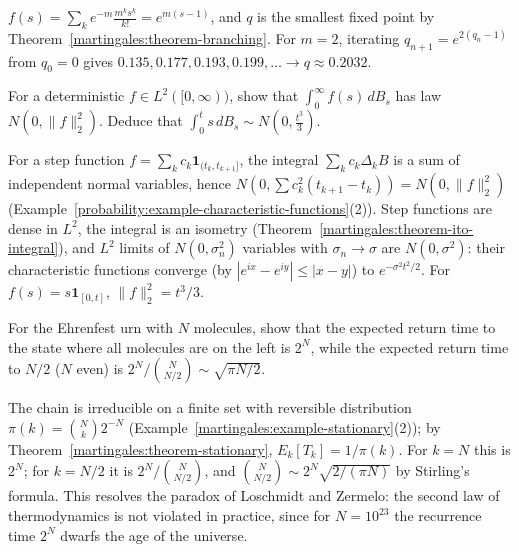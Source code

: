 \begin{solution}
$f(s) = \sum_ke^{-m}\frac{m^ks^k}{k!} = e^{m(s - 1)}$, and $q$ is the smallest fixed point by Theorem~\ref{martingales:theorem-branching}. For $m = 2$, iterating $q_{n+1} = e^{2(q_n - 1)}$ from $q_0 = 0$ gives
$0.135, 0.177, 0.193, 0.199, \ldots \to q \approx 0.2032$.
\end{solution}

\begin{exercise}\label{martingales:exercise-wiener-integral}
For a deterministic $f \in L^2([0, \infty))$, show that $\int_0^\infty f(s)\,dB_s$ has law $N(0, \|f\|_2^2)$. Deduce that $\int_0^ts\,dB_s \sim N(0, \frac{t^3}{3})$.
\end{exercise}

\begin{solution}
For a step function $f = \sum_kc_k\mathbf{1}_{(t_k, t_{k+1}]}$, the integral $\sum_kc_k\Delta_kB$ is a sum of independent normal variables, hence $N(0, \sum c_k^2(t_{k+1} - t_k)) = N(0, \|f\|_2^2)$
(Example~\ref{probability:example-characteristic-functions}(2)). Step functions are dense in $L^2$, the integral is an isometry (Theorem~\ref{martingales:theorem-ito-integral}), and $L^2$ limits of $N(0, \sigma_n^2)$ variables with
$\sigma_n \to \sigma$ are $N(0, \sigma^2)$: their characteristic functions converge (by $|e^{ix} - e^{iy}| \leq |x - y|$) to $e^{-\sigma^2t^2/2}$. For $f(s) = s\mathbf{1}_{[0, t]}$, $\|f\|_2^2 = t^3/3$.
\end{solution}

\begin{exercise}\label{martingales:exercise-ehrenfest-return}
For the Ehrenfest urn with $N$ molecules, show that the expected return time to the state where all molecules are on the left is $2^N$, while the expected return time to $N/2$ ($N$ even) is $2^N/\binom{N}{N/2} \sim \sqrt{\pi N/2}$.
\end{exercise}

\begin{solution}
The chain is irreducible on a finite set with reversible distribution $\pi(k) = \binom Nk2^{-N}$ (Example~\ref{martingales:example-stationary}(2)); by Theorem~\ref{martingales:theorem-stationary}, $E_k[T_k] = 1/\pi(k)$. For $k = N$ this is
$2^N$; for $k = N/2$ it is $2^N/\binom N{N/2}$, and $\binom{N}{N/2} \sim 2^N\sqrt{2/(\pi N)}$ by Stirling's formula. This resolves the paradox of Loschmidt and Zermelo: the second law of thermodynamics is not violated in
practice, since for $N = 10^{23}$ the recurrence time $2^N$ dwarfs the age of the universe.
\end{solution}
